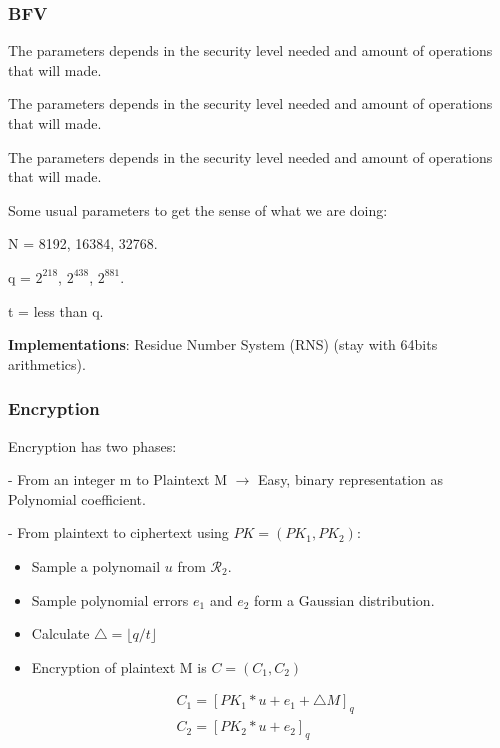 \documentclass[10pt,handout]{beamer}
\begin{document}


\begin{frame}
\frametitle{BFV}

The parameters depends in the security level needed and amount of operations that will made.

The parameters depends in the security level needed and amount of operations that will made.



The parameters depends in the security level needed and amount of operations that will made.


Some usual parameters to get the sense of what we are doing:

N = 8192, 16384, 32768.

q = $2^{218}$,   $2^{438}$,  $2^{881}$.

t = less than q.



    \textbf{Implementations}: Residue Number System (RNS) (stay with 64bits arithmetics).

\end{frame}


\begin{frame}
\frametitle{Encryption}

Encryption has two phases:

 - From an integer m to Plaintext M $\rightarrow$ Easy, binary representation as Polynomial coefficient.

    - From plaintext to ciphertext using $PK = (PK_1, PK_2)$:

\begin{itemize}
    \item Sample a polynomail $u$ from $\mathcal{R}_2$.
    \item Sample polynomial errors $e_1$ and $e_2$ form a Gaussian distribution.
    \item Calculate $\triangle = \lfloor q/t\rfloor $
    \item Encryption of plaintext M is $C=(C_1, C_2)$
\end{itemize}
\begin{align}
    &C_1 = [PK_1 * u + e_1 + \triangle M ]_q\nonumber \\
    &C_2 = [PK_2 * u + e_2]_q\nonumber
\end{align}


\end{frame}
\end{document}
